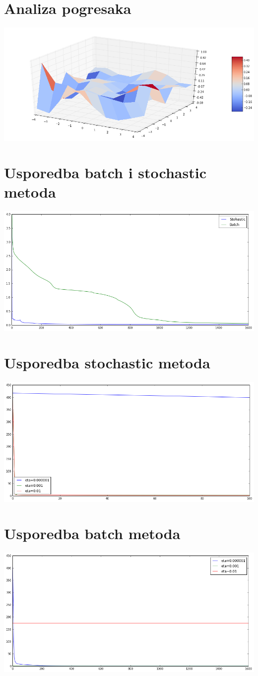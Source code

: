 \documentclass[a4paper, 11pt]{article}
\begin{document}
\section*{Analiza pogresaka}
\includegraphics[width=\textwidth]{diff}
\section*{Usporedba batch i stochastic metoda}
\includegraphics[width=\textwidth]{cmp1}
\section*{Usporedba stochastic metoda}
\includegraphics[width=\textwidth]{cmp2}
\section*{Usporedba batch metoda}
\includegraphics[width=\textwidth]{cmp3}
\end{document}
